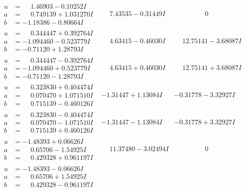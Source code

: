 \documentclass[1p]{elsarticle_modified}
\theoremstyle{definition}
\begin{document}
$$\begin{array}{c|c|c}
\begin{aligned}
u &= \phantom{-}1.46903 - 0.10252 I \\
a &= \phantom{-}0.749139 + 1.031270 I \\
b &= -1.18386 - 0.80664 I\end{aligned}
 & \phantom{-}7.43535 - 0.31449 I & \phantom{-0.000000 } 0 \\ \hline\begin{aligned}
u &= \phantom{-}0.344447 + 0.392764 I \\
a &= -1.094460 - 0.523779 I \\
b &= -0.71120 + 1.28793 I\end{aligned}
 & \phantom{-}4.63415 - 0.46030 I & \phantom{-}12.75141 - 3.68087 I \\ \hline\begin{aligned}
u &= \phantom{-}0.344447 - 0.392764 I \\
a &= -1.094460 + 0.523779 I \\
b &= -0.71120 - 1.28793 I\end{aligned}
 & \phantom{-}4.63415 + 0.46030 I & \phantom{-}12.75141 + 3.68087 I \\ \hline\begin{aligned}
u &= \phantom{-}0.323830 + 0.404474 I \\
a &= \phantom{-}0.070470 + 1.071510 I \\
b &= \phantom{-}0.715139 - 0.460126 I\end{aligned}
 & -1.31447 + 1.13084 I & -0.31778 - 3.32927 I \\ \hline\begin{aligned}
u &= \phantom{-}0.323830 - 0.404474 I \\
a &= \phantom{-}0.070470 - 1.071510 I \\
b &= \phantom{-}0.715139 + 0.460126 I\end{aligned}
 & -1.31447 - 1.13084 I & -0.31778 + 3.32927 I \\ \hline\begin{aligned}
u &= -1.48393 + 0.06626 I \\
a &= \phantom{-}0.65706 - 1.54925 I \\
b &= \phantom{-}0.429328 + 0.961197 I\end{aligned}
 & \phantom{-}11.37480 - 3.02494 I & \phantom{-0.000000 } 0 \\ \hline\begin{aligned}
u &= -1.48393 - 0.06626 I \\
a &= \phantom{-}0.65706 + 1.54925 I \\
b &= \phantom{-}0.429328 - 0.961197 I\end{aligned}

\end{array}$$
\end{document}
